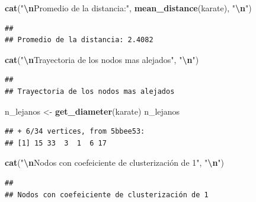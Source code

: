 \documentclass[
]{article}
\newenvironment{Shaded}{\begin{snugshade}}{\end{snugshade}}
\newcommand{\FunctionTok}[1]{\textcolor[rgb]{0.13,0.29,0.53}{\textbf{#1}}}
\newcommand{\NormalTok}[1]{#1}
\newcommand{\OtherTok}[1]{\textcolor[rgb]{0.56,0.35,0.01}{#1}}
\newcommand{\SpecialCharTok}[1]{\textcolor[rgb]{0.81,0.36,0.00}{\textbf{#1}}}
\newcommand{\StringTok}[1]{\textcolor[rgb]{0.31,0.60,0.02}{#1}}
\begin{document}
\begin{Shaded}
\begin{Highlighting}[]
\FunctionTok{cat}\NormalTok{(}\StringTok{"}\SpecialCharTok{\textbackslash{}n}\StringTok{Promedio de la distancia:"}\NormalTok{, }\FunctionTok{mean\_distance}\NormalTok{(karate), }\StringTok{"}\SpecialCharTok{\textbackslash{}n}\StringTok{"}\NormalTok{)}
\end{Highlighting}
\end{Shaded}

\begin{verbatim}
## 
## Promedio de la distancia: 2.4082
\end{verbatim}

\begin{Shaded}
\begin{Highlighting}[]
\FunctionTok{cat}\NormalTok{(}\StringTok{"}\SpecialCharTok{\textbackslash{}n}\StringTok{Trayectoria de los nodos mas alejados"}\NormalTok{, }\StringTok{"}\SpecialCharTok{\textbackslash{}n}\StringTok{"}\NormalTok{)}
\end{Highlighting}
\end{Shaded}

\begin{verbatim}
## 
## Trayectoria de los nodos mas alejados
\end{verbatim}

\begin{Shaded}
\begin{Highlighting}[]
\NormalTok{n\_lejanos }\OtherTok{\textless{}{-}} \FunctionTok{get\_diameter}\NormalTok{(karate)}
\NormalTok{n\_lejanos}
\end{Highlighting}
\end{Shaded}

\begin{verbatim}
## + 6/34 vertices, from 5bbee53:
## [1] 15 33  3  1  6 17
\end{verbatim}

\begin{Shaded}
\begin{Highlighting}[]
\FunctionTok{cat}\NormalTok{(}\StringTok{"}\SpecialCharTok{\textbackslash{}n}\StringTok{Nodos con coefeiciente de clusterización de 1"}\NormalTok{, }\StringTok{"}\SpecialCharTok{\textbackslash{}n}\StringTok{"}\NormalTok{)}
\end{Highlighting}
\end{Shaded}

\begin{verbatim}
## 
## Nodos con coefeiciente de clusterización de 1
\end{verbatim}
\end{document}
